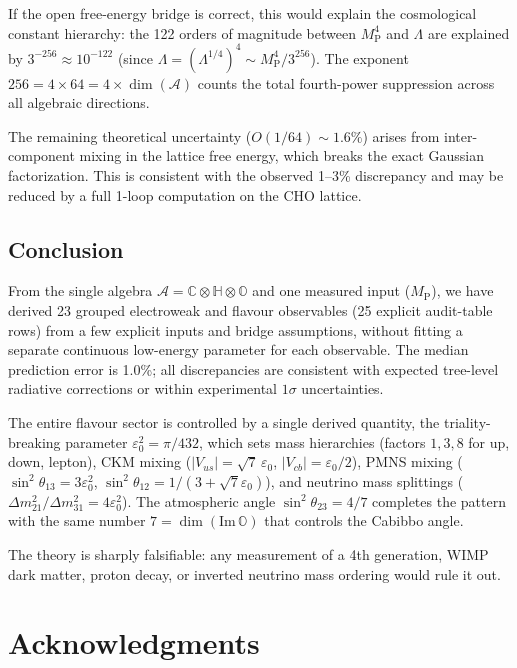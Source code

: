 \documentclass[12pt,a4paper]{article}
\theoremstyle{definition}
\theoremstyle{remark}
\newcommand{\Oct}{\mathbb{O}}
\newcommand{\Quat}{\mathbb{H}}
\newcommand{\Comp}{\mathbb{C}}
\newcommand{\Alg}{\mathcal{A}}
\newcommand{\MP}{M_{\mathrm{P}}}
\begin{document}
If the open free-energy bridge is correct, this would explain the cosmological 
constant hierarchy: the 122 orders of magnitude between $\MP^4$ and $\Lambda$ are explained by 
$3^{-256} \approx 10^{-122}$ (since $\Lambda = (\Lambda^{1/4})^4 \sim 
\MP^4/3^{256}$). The exponent $256 = 4 \times 64 = 4 \times \dim(\Alg)$ 
counts the total fourth-power suppression across all algebraic directions.

The remaining theoretical uncertainty ($O(1/64) \sim 1.6\%$) arises from 
inter-component mixing in the lattice free energy, which breaks the exact 
Gaussian factorization. This is consistent with the observed 1--3\% 
discrepancy and may be reduced by a full 1-loop computation on the CHO lattice.

\subsection{Conclusion}

From the single algebra $\Alg = \Comp\otimes\Quat\otimes\Oct$ and one measured 
input ($\MP$), we have derived 23 grouped electroweak and flavour observables 
(25 explicit audit-table rows) from a few explicit inputs and bridge assumptions, 
without fitting a separate continuous low-energy parameter for each observable. The median prediction error is 1.0\%; all 
discrepancies are consistent with expected tree-level radiative corrections or 
within experimental $1\sigma$ uncertainties. 

The entire flavour sector is controlled by a single derived quantity, the 
triality-breaking parameter $\varepsilon_0^2 = \pi/432$, which sets mass 
hierarchies (factors $1, 3, 8$ for up, down, lepton), CKM mixing 
($|V_{us}| = \sqrt{7}\,\varepsilon_0$, $|V_{cb}| = \varepsilon_0/2$), 
PMNS mixing ($\sin^2\theta_{13} = 3\varepsilon_0^2$, 
$\sin^2\theta_{12} = 1/(3{+}\sqrt{7}\varepsilon_0)$), and neutrino mass 
splittings ($\Delta m^2_{21}/\Delta m^2_{31} = 4\varepsilon_0^2$). The 
atmospheric angle $\sin^2\theta_{23} = 4/7$ completes the pattern with 
the same number $7 = \dim(\mathrm{Im}\,\Oct)$ that controls the Cabibbo 
angle.

The theory is sharply falsifiable: any measurement of a 4th generation, 
WIMP dark matter, proton decay, or inverted neutrino mass ordering would 
rule it out.

\section*{Acknowledgments}
\end{document}
